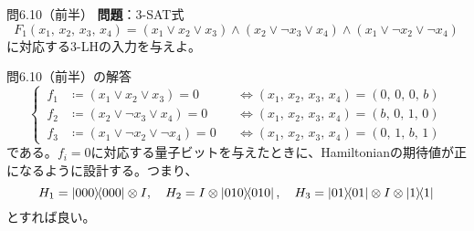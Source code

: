 \documentclass[11pt,aspectratio=169,xcolor=dvipsnames,table,dvipdfmx]{beamer}
\theoremstyle{definition}
\begin{document}
\begin{frame}{問6.10（前半）}
  \textbf{問題}：3-SAT式
  \begin{equation}
    F_1(x_1,\,x_2,\,x_3,\,x_4) = (x_1\lor x_2\lor x_3)\land(x_2\lor \lnot x_3\lor x_4)\land(x_1\lor \lnot x_2\lor \lnot x_4)
  \end{equation}
  に対応する3-LHの入力を与えよ。
  \begin{block}{問6.10（前半）の解答}
    \begin{equation*}
      \left\{ \,
      \begin{aligned}
        f_1 & \coloneqq (x_1\lor x_2\lor x_3) = 0             &  & \Leftrightarrow (x_1,\,x_2,\,x_3,\,x_4) = (0,\,0,\,0,\,b) \\
        f_2 & \coloneqq (x_2\lor \lnot x_3\lor x_4) = 0       &  & \Leftrightarrow (x_1,\,x_2,\,x_3,\,x_4) = (b,\,0,\,1,\,0) \\
        f_3 & \coloneqq (x_1\lor \lnot x_2\lor \lnot x_4) = 0 &  & \Leftrightarrow (x_1,\,x_2,\,x_3,\,x_4) = (0,\,1,\,b,\,1)
      \end{aligned}
      \right.
    \end{equation*}
    である。$f_i =0$に対応する量子ビットを与えたときに、Hamiltonianの期待値が正になるように設計する。つまり、
    \begin{equation*}
      H_1 = \ketbra{000}\otimes I,\quad H_2 = I \otimes \ketbra{010},\quad H_3 = \ketbra{01}\otimes I\otimes \ketbra{1}
    \end{equation*}
    とすれば良い。
  \end{block}
\end{frame}
\end{document}
